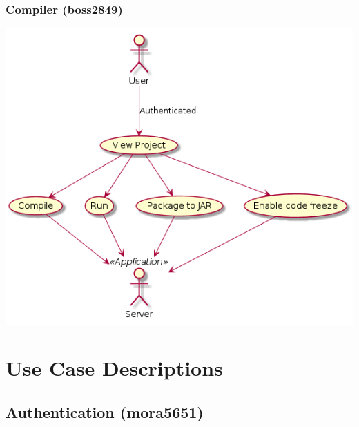 \documentclass[11pt]{report}
\begin{document}
    \subsection{Compiler (boss2849)}
        \includegraphics[width=\textwidth]{diagrams/usecase-compiler}



\chapter{Use Case Descriptions}

\section{Authentication (mora5651)}
\end{document}
